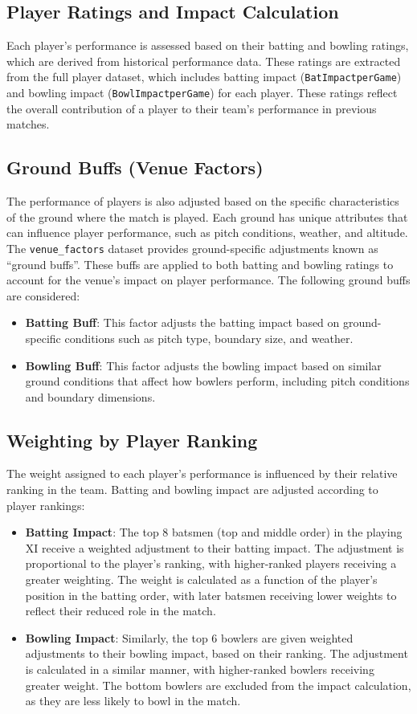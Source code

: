 \documentclass{article}[12pt]
\begin{document}
\subsection{Player Ratings and Impact Calculation}
Each player’s performance is assessed based on their batting and bowling ratings, which are derived from historical performance data. These ratings are extracted from the full player dataset, which includes batting impact (\texttt{BatImpactperGame}) and bowling impact (\texttt{BowlImpactperGame}) for each player. These ratings reflect the overall contribution of a player to their team's performance in previous matches.

\subsection{Ground Buffs (Venue Factors)}
The performance of players is also adjusted based on the specific characteristics of the ground where the match is played. Each ground has unique attributes that can influence player performance, such as pitch conditions, weather, and altitude. The \texttt{venue\_factors} dataset provides ground-specific adjustments known as ``ground buffs''. These buffs are applied to both batting and bowling ratings to account for the venue’s impact on player performance. The following ground buffs are considered:
\begin{itemize}
    \item \textbf{Batting Buff}: This factor adjusts the batting impact based on ground-specific conditions such as pitch type, boundary size, and weather.
    \item \textbf{Bowling Buff}: This factor adjusts the bowling impact based on similar ground conditions that affect how bowlers perform, including pitch conditions and boundary dimensions.
\end{itemize}

\subsection{Weighting by Player Ranking}
The weight assigned to each player's performance is influenced by their relative ranking in the team. Batting and bowling impact are adjusted according to player rankings:
\begin{itemize}
    \item \textbf{Batting Impact}: The top 8 batsmen (top and middle order) in the playing XI receive a weighted adjustment to their batting impact. The adjustment is proportional to the player’s ranking, with higher-ranked players receiving a greater weighting. The weight is calculated as a function of the player's position in the batting order, with later batsmen receiving lower weights to reflect their reduced role in the match.
    \item \textbf{Bowling Impact}: Similarly, the top 6 bowlers are given weighted adjustments to their bowling impact, based on their ranking. The adjustment is calculated in a similar manner, with higher-ranked bowlers receiving greater weight. The bottom bowlers are excluded from the impact calculation, as they are less likely to bowl in the match.
\end{itemize}
\end{document}
